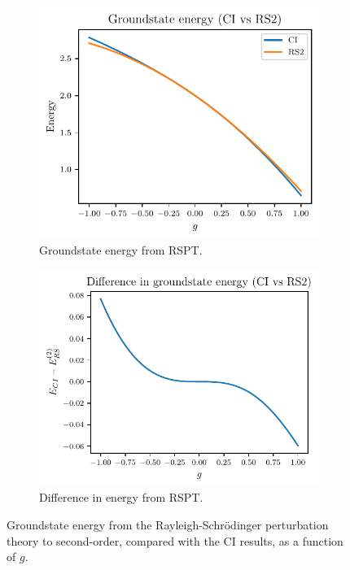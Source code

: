 \begin{figure}[htbp]
    \centering
    \begin{subfigure}[b]{0.45\textwidth}
        \centering
        \includegraphics[width=\textwidth]{figures/f_groundstate_energy.pdf}
        \caption{
            Groundstate energy from RSPT.\label{fig:rs2_energy}
        }
    \end{subfigure}
    \hfill
    \begin{subfigure}[b]{0.48\textwidth}
        \centering
        \includegraphics[width=\textwidth]{figures/f_groundstate_energy_diff.pdf}
        \caption{
            Difference in energy from RSPT.\label{fig:rs2_diff}
        }
    \end{subfigure}
    \caption{
        Groundstate energy from the Rayleigh-Schr\"odinger perturbation theory to second-order, compared with the CI results, as a function of $g$.\label{fig:rs2}
    }
\end{figure}

